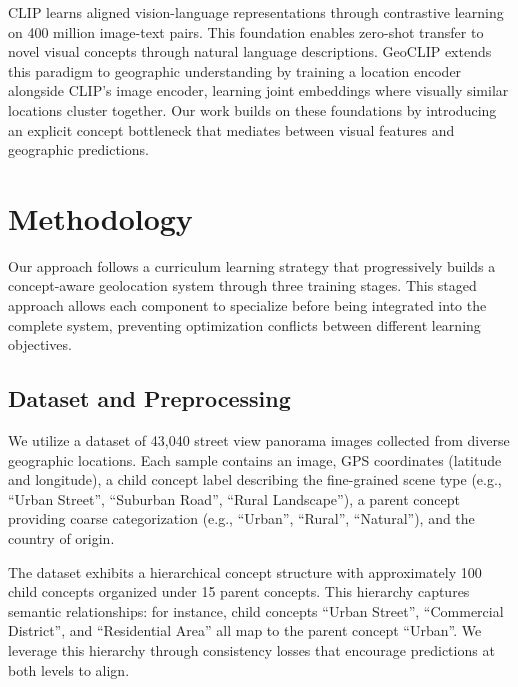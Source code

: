 \documentclass{uva-inf-article}
\begin{document}
CLIP \parencite{radford2021learning} learns aligned vision-language representations through contrastive learning on 400 million image-text pairs. This foundation enables zero-shot transfer to novel visual concepts through natural language descriptions. GeoCLIP \parencite{cepeda2023geoclip} extends this paradigm to geographic understanding by training a location encoder alongside CLIP's image encoder, learning joint embeddings where visually similar locations cluster together. Our work builds on these foundations by introducing an explicit concept bottleneck that mediates between visual features and geographic predictions.


\section{Methodology}
\label{sec:methodology}

Our approach follows a curriculum learning strategy \parencite{bengio2009curriculum} that progressively builds a concept-aware geolocation system through three training stages. This staged approach allows each component to specialize before being integrated into the complete system, preventing optimization conflicts between different learning objectives.

\subsection{Dataset and Preprocessing}

We utilize a dataset of 43,040 street view panorama images collected from diverse geographic locations. Each sample contains an image, GPS coordinates (latitude and longitude), a child concept label describing the fine-grained scene type (e.g., ``Urban Street'', ``Suburban Road'', ``Rural Landscape''), a parent concept providing coarse categorization (e.g., ``Urban'', ``Rural'', ``Natural''), and the country of origin.

The dataset exhibits a hierarchical concept structure with approximately 100 child concepts organized under 15 parent concepts. This hierarchy captures semantic relationships: for instance, child concepts ``Urban Street'', ``Commercial District'', and ``Residential Area'' all map to the parent concept ``Urban''. We leverage this hierarchy through consistency losses that encourage predictions at both levels to align.
\end{document}
